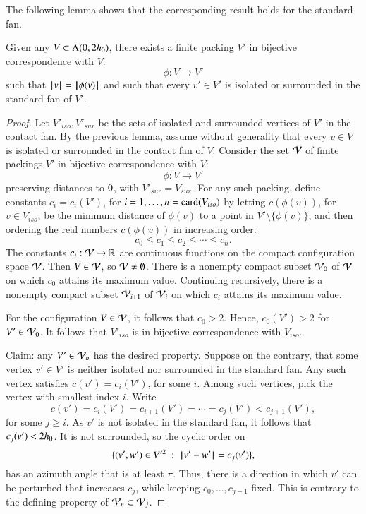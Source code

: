 {The following lemma shows that the corresponding result
holds for the standard fan.

\begin{lemma}\label{lemma:surrounded}  
Given any $V\subset \Lambda(0,2{h_0})$,
there exists a finite packing $V'$ 
in bijective correspondence with $V$:
$$
\phi:V\to V'
$$
such that ${{\hskip0.1em|\hskip-0.15em|\hskip0.1em}v{\hskip0.1em|\hskip-0.15em|\hskip0.1em}} = {{\hskip0.1em|\hskip-0.15em|\hskip0.1em}\phi(v){\hskip0.1em|\hskip-0.15em|\hskip0.1em}}$ and
such that every $v'\in V'$
is isolated or surrounded in the standard fan of $V'$.
\end{lemma}

\begin{proof}  
Let $V'_{iso},V'_{sur}$ be the
sets of isolated and surrounded vertices of $V'$ in the contact
fan.
By the previous lemma,  assume
without generality that every $v\in V$ is isolated
or surrounded in the contact fan of $V$.    
Consider the set ${\mathcal V}$ of finite
packings $V'$ in bijective correspondence with $V$:
$$
\phi:V\to V'
$$
preserving distances to $0$, with $V'_{sur}=V_{sur}$.
For any such packing, define constants $c_i=c_i(V')$,
for $i=1,\ldots,n={\operatorname{card}}(V_{iso})$ by letting 
$c(\phi(v))$, for $v\in V_{iso}$, 
be the minimum distance of $\phi(v)$ to a point
in $V'\setminus \{\phi(v)\}$, and then ordering the real numbers $c(\phi(v))$ in increasing order:
$$
c_0 \le c_1 \le c_2 \le \cdots \le c_n.
$$
The constants $c_i:{\mathcal V}\to\mathbb{R}$ are continuous functions on the compact configuration space ${\mathcal V}$.
Then $V\in {\mathcal V}$, so ${\mathcal V}\ne\emptyset$.
There is a nonempty 
compact subset ${\mathcal V}_0$ of ${\mathcal V}$ on which
$c_0$ attains its maximum value. Continuing recursively,
there is a nonempty compact subset ${\mathcal V}_{i+1}$ of
${\mathcal V}_{i}$ on which $c_i$ attains its maximum value.

For the configuration $V\in {\mathcal V}$, it follows that $c_0 >2$.
Hence, $c_0(V')>2$ for $V'\in{\mathcal V}_0$.  It follows
that $V'_{iso}$ is in bijective correspondence with
$V_{iso}$.

Claim:  any $V'\in {\mathcal V}_n$ has the desired property.
Suppose on the contrary, that some vertex $v'\in V'$
is neither isolated nor surrounded in the standard fan.  
Any such vertex satisfies $c(v')=c_i(V')$, for some $i$.
Among such vertices, pick the vertex with smallest index
$i$.  Write 
$$
c(v') = c_i(V') = c_{i+1}(V') =\cdots= c_j(V') < c_{j+1}(V'),
$$
for some $j\ge i$.  As $v'$ is not isolated in the
standard fan, it follows that $c_j(v') < 2{h_0}$.  It is not surrounded,
so the cyclic order on
$$
\{(v',w')\in V'^2 \ :\  {\hskip0.1em|\hskip-0.15em|\hskip0.1em}v' - w'{\hskip0.1em|\hskip-0.15em|\hskip0.1em} = c_j(v')\},
$$
has an azimuth angle that is at least $\pi$.
Thus, there is a direction in which $v'$ can be perturbed
that increases $c_j$, while keeping $c_0,\ldots,c_{j-1}$
fixed.  This is contrary to the defining property of
${\mathcal V}_n\subset{\mathcal V}_j$.
\end{proof}


}
